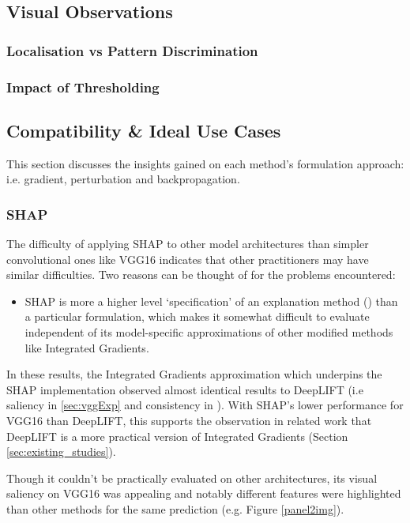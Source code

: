 \documentclass[main]{subfiles}
\begin{document}
\newpage
\subsection{Visual Observations}

\subsubsection{Localisation vs Pattern Discrimination}

\subsubsection{Impact of Thresholding}


\newpage
\subsection{Compatibility \& Ideal Use Cases}
This section discusses the insights gained on each method's formulation approach: i.e. gradient, perturbation and backpropagation.
\subsubsection{SHAP}
The difficulty of applying SHAP to other model architectures than simpler convolutional ones like VGG16 indicates that other practitioners may have similar difficulties. Two reasons can be thought of for the problems encountered:
\begin{itemize}
\item SHAP is more a higher level `specification' of an explanation method  (\label{sec:othermodelag}) than a particular formulation, which makes it somewhat difficult to evaluate independent of its model-specific approximations of other modified methods like Integrated Gradients. 

\end{itemize}
In these results, the Integrated Gradients approximation which underpins the SHAP implementation observed almost identical results to DeepLIFT (i.e saliency in \ref{sec:vggExp} and consistency in ). With SHAP's lower performance for VGG16 than DeepLIFT, this supports the observation in related work that DeepLIFT is a more practical version of Integrated Gradients (Section \ref{sec:existing_studies}).

Though it couldn't be practically evaluated on other architectures, its visual saliency on VGG16 was appealing and notably different features were highlighted than other methods for the same prediction (e.g. Figure \ref{panel2img}).
\end{document}
